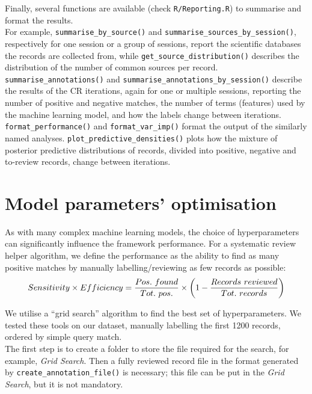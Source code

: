 \documentclass[
]{article}
\begin{document}
Finally, several functions are available (check \texttt{R/Reporting.R})
to summarise and format the results.\\
For example, \texttt{summarise\_by\_source()} and
\texttt{summarise\_sources\_by\_session()}, respectively for one session
or a group of sessions, report the scientific databases the records are
collected from, while \texttt{get\_source\_distribution()} describes the
distribution of the number of common sources per record.\\
\texttt{summarise\_annotations()} and
\texttt{summarise\_annotations\_by\_session()} describe the results of
the CR iterations, again for one or multiple sessions, reporting the
number of positive and negative matches, the number of terms (features)
used by the machine learning model, and how the labels change between
iterations. \texttt{format\_performance()} and
\texttt{format\_var\_imp()} format the output of the similarly named
analyses. \texttt{plot\_predictive\_densities()} plots how the mixture
of posterior predictive distributions of records, divided into positive,
negative and to-review records, change between iterations.

\hypertarget{model-parameters-optimisation}{%
\section{Model parameters'
optimisation}\label{model-parameters-optimisation}}

As with many complex machine learning models, the choice of
hyperparameters can significantly influence the framework performance.
For a systematic review helper algorithm, we define the performance as
the ability to find as many positive matches by manually
labelling/reviewing as few records as possible:\\

\[
Sensitivity \times Efficiency = \\
\frac{Pos.\ found}{Tot.\ pos.} \times \bigg(1 - \frac{Records\ reviewed}{Tot.\ records}\bigg)
\]

We utilise a ``grid search'' algorithm to find the best set of
hyperparameters. We tested these tools on our dataset, manually
labelling the first 1200 records, ordered by simple query match.\\
The first step is to create a folder to store the file required for the
search, for example, \emph{Grid Search}. Then a fully reviewed record
file in the format generated by \texttt{create\_annotation\_file()} is
necessary; this file can be put in the \emph{Grid Search}, but it is not
mandatory.\\
\end{document}
